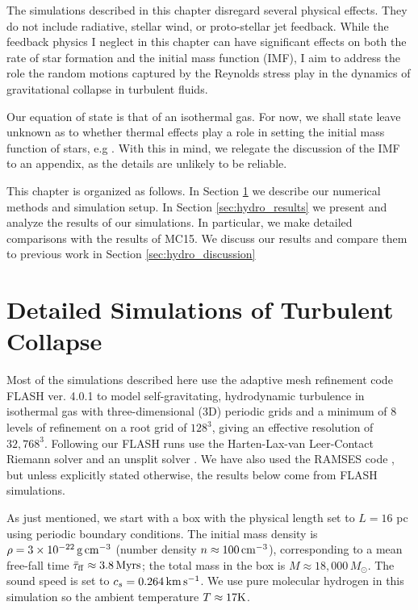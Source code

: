\documentclass[../dissertation.tex]{subfiles}
\begin{document}
The simulations described in this chapter disregard several physical effects.
They do not include radiative, stellar wind, or proto-stellar jet feedback.
While the feedback physics I neglect in this chapter can have significant effects on both the rate of star formation and the initial mass function (IMF), I aim to address the role the random motions captured by the Reynolds stress play in the dynamics of gravitational collapse in turbulent fluids.

Our equation of state is that of an isothermal gas. 
For now, we shall state leave unknown as to whether thermal effects play a role in setting the initial mass function of stars, e.g \citet{2005MNRAS.359..211L}.
With this in mind, we relegate the discussion of the IMF to an appendix, as the details are unlikely to be reliable.

This chapter is organized as follows. In Section \ref{sec:hydro_simulation setup}
we describe our numerical methods and simulation setup. In Section
\ref{sec:hydro_results} we present and analyze the results of our simulations. 
In particular, we make detailed comparisons with the results of MC15.  
We discuss our results and compare
them to previous work in Section \ref{sec:hydro_discussion}


\section{Detailed Simulations of Turbulent Collapse} \label{sec:hydro_simulation setup}

Most of the simulations described here use the adaptive mesh refinement code FLASH ver. 4.0.1 
\citep{2000ApJS..131..273F, 2008ASPC..385..145D} to model self-gravitating, hydrodynamic turbulence in isothermal gas with three-dimensional (3D) periodic grids and a minimum of 8 levels of refinement on a root grid of $128^3$, 
giving an effective resolution of $32,768^3$.  
Following \citet{2015ApJ...800...49L} our FLASH runs use the Harten-Lax-van Leer-Contact 
Riemann solver and an unsplit solver \citep{2009ASPC..406..243L}. We have also used the RAMSES code \citep{2002A&A...385..337T}, but unless explicitly stated otherwise, the results below come from FLASH simulations.


As just mentioned, we start with a box with the physical length set to $L = 16$ pc using 
periodic boundary conditions. The initial mass density is 
$\rho = 3\times10^{-22}\,{\rm g\,cm}^{-3}$ (number density $n \approx 100\,{\rm cm}^{-3}$), 
corresponding to a mean 
free-fall time $\bar\tau_{\rm ff}\approx3.8\,{\rm Myrs}$; the total mass in the
box is $M\approx 18,000\,M_\odot$.
The sound speed is set to $c_s = 0.264\,{\rm km\,s^{-1}}$.
We use pure molecular hydrogen in this simulation so the ambient 
temperature $T \approx 17 {\rm K}$.
\end{document}
